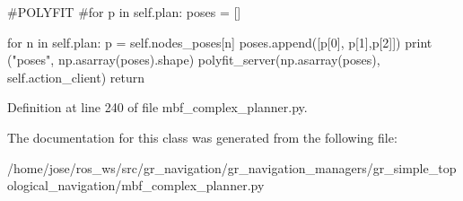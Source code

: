 \begin{DoxyVerb}#POLYFIT
#for p in self.plan:
poses = []

for n in self.plan:
    p = self.nodes_poses[n]
    poses.append([p[0], p[1],p[2]])
print ("poses", np.asarray(poses).shape)
polyfit_server(np.asarray(poses), self.action_client)
return
\end{DoxyVerb}
 

Definition at line 240 of file mbf\+\_\+complex\+\_\+planner.\+py.



The documentation for this class was generated from the following file\+:\begin{DoxyCompactItemize}
\item 
/home/jose/ros\+\_\+ws/src/gr\+\_\+navigation/gr\+\_\+navigation\+\_\+managers/gr\+\_\+simple\+\_\+topological\+\_\+navigation/mbf\+\_\+complex\+\_\+planner.\+py\end{DoxyCompactItemize}
